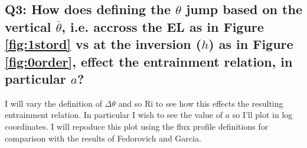 \subsection{Q3: How does defining the $\theta$ jump based on the vertical $\overline{\theta}$, i.e. accross the \acs{EL} as in Figure \ref{fig:1stord} vs at the inversion ($h$) as in Figure \ref{fig:0order}, effect the entrainment relation, in particular $a$?}

I will vary the definition of $\Delta \theta$ and so \acs{Ri} to see how this effects the resulting entrainment relation.  In particular I wish to see the value of $a$ so I'll plot in log coordinates.  I will repoduce this plot using the flux profile definitions for comparison with the results of Fedorovich and Garcia.

\endinput

Any text after an \endinput is ignored.
You could put scraps here or things in progress.



